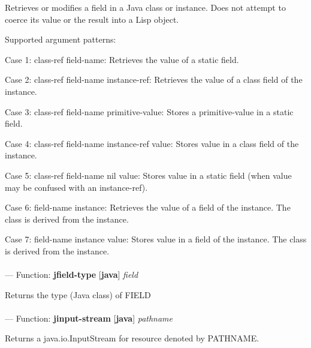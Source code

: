 \begin{adjustwidth}{5em}{5em}
Retrieves or modifies a field in a Java class or instance. Does not
attempt to coerce its value or the result into a Lisp object.

Supported argument patterns:

   Case 1: class-ref  field-name:
      Retrieves the value of a static field.

   Case 2: class-ref  field-name  instance-ref:
      Retrieves the value of a class field of the instance.

   Case 3: class-ref  field-name  primitive-value:
      Stores a primitive-value in a static field.

   Case 4: class-ref  field-name  instance-ref  value:
      Stores value in a class field of the instance.

   Case 5: class-ref  field-name  nil  value:
      Stores value in a static field (when value may be
      confused with an instance-ref).

   Case 6: field-name  instance:
      Retrieves the value of a field of the instance. The
      class is derived from the instance.

   Case 7: field-name  instance  value:
      Stores value in a field of the instance. The class is
      derived from the instance.


\end{adjustwidth}

\paragraph{}
\label{JAVA:JFIELD-TYPE}
--- Function: \textbf{jfield-type} [\textbf{java}] \textit{field}

\begin{adjustwidth}{5em}{5em}
Returns the type (Java class) of FIELD
\end{adjustwidth}

\paragraph{}
\label{JAVA:JINPUT-STREAM}
--- Function: \textbf{jinput-stream} [\textbf{java}] \textit{pathname}

\begin{adjustwidth}{5em}{5em}
Returns a java.io.InputStream for resource denoted by PATHNAME.
\end{adjustwidth}

